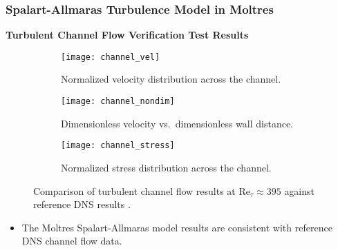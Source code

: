 \begin{frame}
  \frametitle{Spalart-Allmaras Turbulence Model in Moltres}
  \textbf{Turbulent Channel Flow Verification Test Results}
  \begin{figure}[htb!]
    \centering
    \begin{subfigure}[b]{0.32\columnwidth}
      \centering
      \texttt{[image: channel\_vel]}
      \caption{Normalized velocity distribution across the channel.}
      \label{fig:channel-vel}
    \end{subfigure}
    \hfill
    \begin{subfigure}[b]{0.32\columnwidth}
      \centering
      \texttt{[image: channel\_nondim]}
      \caption{Dimensionless velocity vs.\ dimensionless wall distance.}
      \label{fig:channel-nondim}
    \end{subfigure}
    \begin{subfigure}[b]{0.32\columnwidth}
      \centering
      \texttt{[image: channel\_stress]}
      \caption{Normalized stress distribution across the channel.}
      \label{fig:channel-stress}
    \end{subfigure}
    \caption{Comparison of turbulent channel flow results at Re$_\tau\approx395$ against reference
    \gls{DNS} results \cite{moser_direct_1999}.}
    \label{fig:channel-verification}
  \end{figure}
  \begin{itemize}
    \item The Moltres Spalart-Allmaras model results are consistent with reference DNS channel flow data.
  \end{itemize}
\end{frame}

